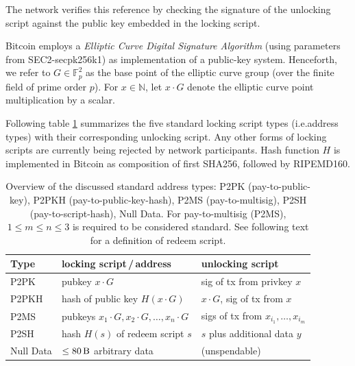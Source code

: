 \documentclass[a4paper,11pt,titlepage]{scrbook}
\begin{document}
The network verifies this reference by checking the signature of the unlocking script against the public key embedded in the locking script.


Bitcoin employs a \emph{Elliptic Curve Digital Signature Algorithm} (using parameters from SEC2-secpk256k1) as implementation of a public-key system.
Henceforth, we refer to $G\in \mathbb{F}_p^2$ as the base point of the elliptic curve group (over the finite field of prime order $p$). For $x\in \mathbb{N}$, let $x\cdot G$ denote the elliptic curve point multiplication by a scalar.

Following table \ref{table:script-types} summarizes the five standard locking script types (i.e.\@ address types) with their corresponding unlocking script. Any other forms of locking scripts are currently being rejected by network participants.
Hash function $H$ is implemented in Bitcoin as composition of first SHA256, followed by RIPEMD160.

\begin{table}
    \renewcommand{\arraystretch}{1.2}
    \centering
    \begin{tabular}{lll}
        \toprule
        \textbf{Type} & \textbf{locking script\,/\,address} & \textbf{unlocking script} \\
        \midrule
        P2PK & pubkey $x\cdot G$ & sig of tx from privkey $x$ \\
        P2PKH & hash of public key $H(x\cdot G)$ & $x\cdot G$, sig of tx from $x$ \\
        P2MS & pubkeys $x_1{\cdot} G, x_2{\cdot} G, \dots, x_n{\cdot} G$ & sigs of tx from $x_{i_1}, \dots, x_{i_m}$ \\
        P2SH & hash $H(s)$ of redeem script $s$ & $s$ plus additional data $y$ \\
        Null Data & $\leq \SI{80}{\byte}$ arbitrary data & (unspendable)\\
        \bottomrule
    \end{tabular}
    \caption[Overview of the discussed standard address types]{Overview of the discussed standard address types: P2PK (pay-to-public-key), P2PKH (pay-to-public-key-hash), P2MS (pay-to-multisig), P2SH (pay-to-script-hash), Null Data. For pay-to-multisig (P2MS), $1\leq m\leq n\leq 3$ is required to be considered standard. See following text for a definition of redeem script.}
    \label{table:script-types}
\end{table}
\end{document}

